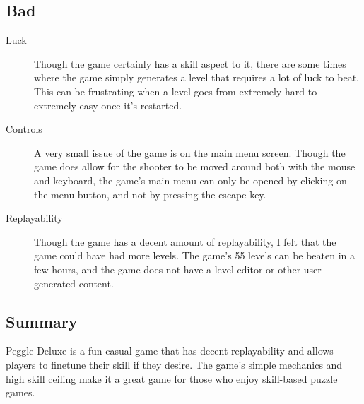 \documentclass{article}
\begin{document}
\subsection{Bad}
\begin{description}
      \item[Luck] Though the game certainly has a skill aspect to it, there are
            some times where the game simply generates a level that requires a lot of
            luck to beat. This can be frustrating when a level goes from extremely
            hard to extremely easy once it's restarted.
      \item[Controls] A very small issue of the game is on the main menu screen.
            Though the game does allow for the shooter to be moved around both with
            the mouse and keyboard, the game's main menu can only be opened by
            clicking on the menu button, and not by pressing the escape key.
      \item[Replayability] Though the game has a decent amount of replayability,
            I felt that the game could have had more levels. The game's 55 levels can
            be beaten in a few hours, and the game does not have a level editor or
            other user-generated content.
\end{description}

\subsection{Summary}
Peggle Deluxe is a fun casual game that has decent replayability and allows
players to finetune their skill if they desire. The game's simple mechanics and
high skill ceiling make it a great game for those who enjoy skill-based puzzle games.
\end{document}
